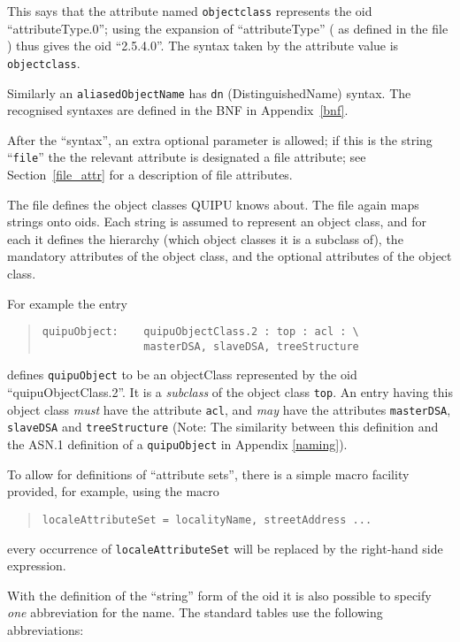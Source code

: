 This says that the attribute named \verb+objectclass+ represents the oid
``attributeType.0''; using the expansion of ``attributeType'' (
as defined in the 
file ) thus gives the oid ``2.5.4.0''.
The syntax taken by the attribute value is \verb+objectclass+.

Similarly an \verb+aliasedObjectName+ has \verb+dn+ (DistinguishedName) syntax.
The recognised syntaxes are defined in the BNF in 
Appendix~\ref{bnf}.

After the ``syntax'', an extra optional parameter is allowed;
if this is the string ``\verb"file"'' the the relevant attribute is 
designated a file attribute; see Section~\ref{file_attr} for a
description of file attributes.


The file  defines the object classes QUIPU knows about.
The file again maps strings onto oids.
Each string is assumed to represent an object class, and for each it
defines the hierarchy (which object classes it is a subclass of),
the mandatory attributes of the object class, and the optional attributes of
the object class.

For example the entry
\begin{quote}\small\begin{verbatim}
quipuObject:  	quipuObjectClass.2 : top : acl : \
                masterDSA, slaveDSA, treeStructure
\end{verbatim}\end{quote}
defines \verb+quipuObject+ to be an objectClass represented by the oid
``quipuObjectClass.2''.
It is a {\em subclass} of the object class \verb+top+.
An entry having this object class {\em must} have the attribute
\verb+acl+, and {\em may}
have the attributes \verb+masterDSA+, \verb+slaveDSA+ and \verb+treeStructure+
(Note: The similarity between this definition and the ASN.1 definition of
a \verb+quipuObject+ in Appendix \ref{naming}).

To allow for definitions of ``attribute sets'', there is a simple 
macro facility provided, for example, using the macro
\begin{quote}\small\begin{verbatim}
localeAttributeSet = localityName, streetAddress ...
\end{verbatim}\end{quote}
every occurrence of \verb"localeAttributeSet" will be replaced by
the right-hand side expression.


With the definition of the ``string'' form of the oid it is also possible
to specify {\em one} abbreviation for the name.
The standard tables use the following abbreviations:

